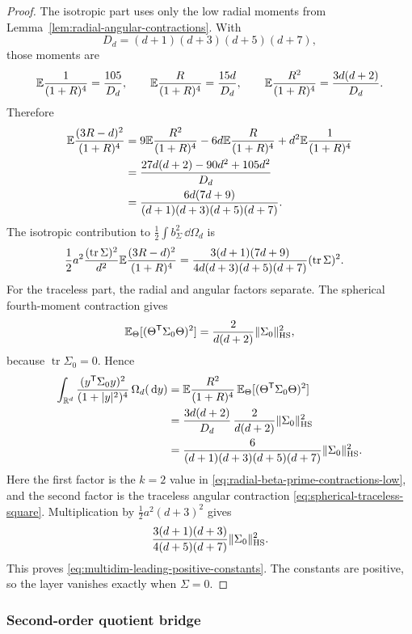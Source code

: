 \begin{proof}
The isotropic part uses only the low radial moments from
Lemma~\ref{lem:radial-angular-contractions}.  With
\[
  D_d=(d+1)(d+3)(d+5)(d+7),
\]
those moments are
\[
  \mathbb{E}\frac1{(1+R)^4}=\frac{105}{D_d},\qquad
  \mathbb{E}\frac{R}{(1+R)^4}=\frac{15d}{D_d},\qquad
  \mathbb{E}\frac{R^2}{(1+R)^4}=\frac{3d(d+2)}{D_d}.
\]
Therefore
\[
\begin{aligned}
\mathbb{E}\frac{(3R-d)^2}{(1+R)^4}
&=
9\mathbb{E}\frac{R^2}{(1+R)^4}
-6d\mathbb{E}\frac{R}{(1+R)^4}
+d^2\mathbb{E}\frac1{(1+R)^4} \\
&=
\frac{27d(d+2)-90d^2+105d^2}{D_d} \\
&=
\frac{6d(7d+9)}
{(d+1)(d+3)(d+5)(d+7)} .
\end{aligned}
\]
The isotropic contribution to \(\frac12\int b_\Sigma^2\,\dd\Omega_d\) is
\[
\begin{aligned}
\frac12 a^2\frac{(\operatorname{tr}\Sigma)^2}{d^2}
\mathbb{E}\frac{(3R-d)^2}{(1+R)^4}
&=
\frac{3(d+1)(7d+9)}
{4d(d+3)(d+5)(d+7)}
(\operatorname{tr}\Sigma)^2 .
\end{aligned}
\]
For the traceless part, the radial and angular factors separate.  The
spherical fourth-moment contraction gives
\[
\mathbb{E}_\Theta[(\Theta^{\mathsf T}\Sigma_0\Theta)^2]
=\frac{2}{d(d+2)}\|\Sigma_0\|_{\rm HS}^2,
\]
because \(\operatorname{tr}\Sigma_0=0\).  Hence
\[
\begin{aligned}
\int_{\mathbb{R}^d}
\frac{(y^{\mathsf T}\Sigma_0y)^2}{(1+|y|^2)^4}\,\Omega_d(\,\mathrm{d} y)
&=
\mathbb{E}\frac{R^2}{(1+R)^4}\,
\mathbb{E}_\Theta[(\Theta^{\mathsf T}\Sigma_0\Theta)^2] \\
&=
\frac{3d(d+2)}{D_d}\,
\frac{2}{d(d+2)}
\|\Sigma_0\|_{\rm HS}^2 \\
&=
\frac{6}{(d+1)(d+3)(d+5)(d+7)}
\|\Sigma_0\|_{\rm HS}^2 .
\end{aligned}
\]
Here the first factor is the \(k=2\) value in
\eqref{eq:radial-beta-prime-contractions-low}, and the second factor is the
traceless angular contraction
\eqref{eq:spherical-traceless-square}.
Multiplication by \(\frac12a^2(d+3)^2\) gives
\[
\frac{3(d+1)(d+3)}{4(d+5)(d+7)}
\|\Sigma_0\|_{\rm HS}^2 .
\]
This proves \eqref{eq:multidim-leading-positive-constants}.  The constants are
positive, so the layer vanishes exactly when \(\Sigma=0\).
\end{proof}
\fi

\subsubsection*{Second-order quotient bridge}\leavevmode\par\smallskip

